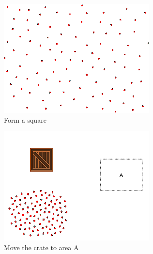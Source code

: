 \documentclass[]{article}
\begin{document}
\begin{figure}
\begin{subfigure}{0.42\textwidth}
		\includegraphics[width=\linewidth]{slide_images/Swarm_Robot_Control_-_100_Robot_0023.png}
		\caption{Form a square}
		\label{fig:sub1}
	\end{subfigure}%
	\begin{subfigure}{0.42\textwidth}
		\centering
		\includegraphics[width=\linewidth]{slide_images/Swarm_Robot_Control_-_100_Robot_0025.png}
		\caption{Move the crate to area A}
		\label{fig:sub1}
	\end{subfigure}
	\begin{subfigure}{0.42\textwidth}
		\centering

\end{subfigure}
\end{figure}
\end{document}
